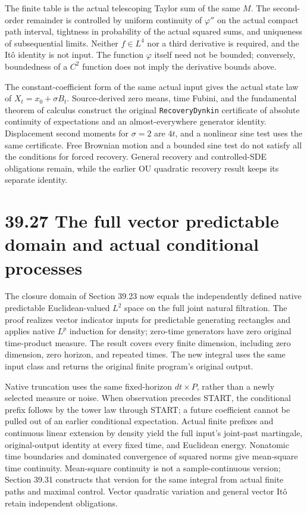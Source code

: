 \documentclass[
  english,
  11pt,
  oneside]{book}
\begin{document}
The finite table is the actual telescoping Taylor sum of the same \(M\). The second-order remainder is controlled by uniform continuity of \(\varphi''\) on the actual compact path interval, tightness in probability of the actual squared sums, and uniqueness of subsequential limits. Neither \(f\in L^4\) nor a third derivative is required, and the Itô identity is not input. The function \(\varphi\) itself need not be bounded; conversely, boundedness of a \(C^2\) function does not imply the derivative bounds above.

The constant-coefficient form of the same actual input gives the actual state law of \(X_t=x_0+\sigma B_t\). Source-derived zero means, time Fubini, and the fundamental theorem of calculus construct the original \nolinkurl{RecoveryDynkin} certificate of absolute continuity of expectations and an almost-everywhere generator identity. Displacement second moments for \(\sigma=2\) are \(4t\), and a nonlinear sine test uses the same certificate. Free Brownian motion and a bounded sine test do not satisfy all the conditions for forced recovery. General recovery and controlled-SDE obligations remain, while the earlier OU quadratic recovery result keeps its separate identity.

\section{39.27 The full vector predictable domain and actual conditional processes}\label{the-full-vector-predictable-domain-and-actual-conditional-processes}

The closure domain of Section 39.23 now equals the independently defined native predictable Euclidean-valued \(L^2\) space on the full joint natural filtration. The proof realizes vector indicator inputs for predictable generating rectangles and applies native \(L^p\) induction for density; zero-time generators have zero original time-product measure. The result covers every finite dimension, including zero dimension, zero horizon, and repeated times. The new integral uses the same input class and returns the original finite program's original output.

Native truncation uses the same fixed-horizon \(dt\times P\), rather than a newly selected measure or noise. When observation precedes START, the conditional prefix follows by the tower law through START; a future coefficient cannot be pulled out of an earlier conditional expectation. Actual finite prefixes and continuous linear extension by density yield the full input's joint-past martingale, original-output identity at every fixed time, and Euclidean energy. Nonatomic time boundaries and dominated convergence of squared norms give mean-square time continuity. Mean-square continuity is not a sample-continuous version; Section 39.31 constructs that version for the same integral from actual finite paths and maximal control. Vector quadratic variation and general vector Itô retain independent obligations.
\end{document}

